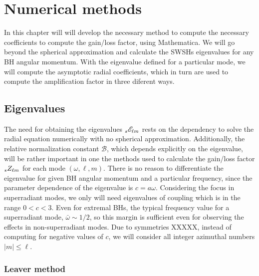 
\chapter{Numerical methods} %
\label{Chapter4}

In this chapter will will develop the necessary method to compute the necessary coefficients to compute the gain/loss factor, using Mathematica\texttrademark.
We will go beyond the spherical approximation and calculate the SWSHs eigenvalues for any BH angular momentum.
With the eigenvalue defined for a particular mode, we will compute the asymptotic radial coefficients, which in turn are used to compute the amplification factor in three diferent ways.

\section{Eigenvalues}

The need for obtaining the eigenvalues $\uu[s]{\mathscr{E}}{\ell m}$ rests on the dependency to solve the radial equation numerically with no spherical approximation.
Additionally, the relative normalization constant $\mathscr{B}$, which depends explicitly on the eigenvalue, will be rather important in one the methods used to calculate the gain/loss factor $\uu[s]{Z}{\ell m}$ for each mode $(\omega,\ell,m)$.
There is no reason to differentiate the eigenvalue for given BH angular momentum and a particular frequency, since the parameter dependence of the eigenvalue is $c=a\omega$.
Considering the focus in superradiant modes, we only will need eigenvalues of coupling which is in the range $0<c<3$. 
Even for extremal BHs, the typical frequency value for a superradiant mode, $\bar{\omega}\sim 1/2$, so this margin is sufficient even for observing the effects in non-superradiant modes.
Due to symmetries XXXXX, instead of computing for negative values of $c$, we will consider all integer azimuthal numbers $|m|\le \ell$.

\subsection{Leaver method}

